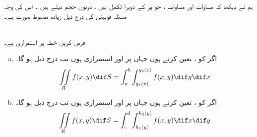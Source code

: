 ہم نے دیکھا کہ مساوات  اور مساوات ، جو  پر  کے دوہرا تکمل ہیں ،   دونوں حجم  دیتے ہیں ۔ اس کی وجہ مسئلہ فوبینی   کی درج ذیل  زیادہ مضبوط  صورت ہے۔

\\
فرض کریں خطہ  پر  استمراری ہے۔
\begin{enumerate}[a.]
\item
اگر   کو  ،  تعین کرتے ہوں جہاں  پر  اور  استمراری ہوں  تب درج ذیل ہو گا۔
\begin{align*}
\iint\limits_R f(x,y)\dif S=\int_a^b\int_{g_1(x)}^{g_2(x)}f(x,y)\dif y\dif x
\end{align*} 
\item

اگر   کو  ،  تعین کرتے ہوں جہاں  پر  اور  استمراری ہوں  تب درج ذیل ہو گا۔
\begin{align*}
\iint\limits_R f(x,y)\dif S=\int_c^d\int_{h_1(y)}^{h_2(y)}f(x,y)\dif x\dif y
\end{align*} 
\end{enumerate}

